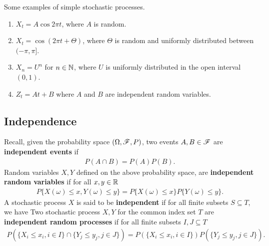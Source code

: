 \documentclass[letterpaper,10pt,english]{article}
\begin{document}
\begin{shaded*}
\begin{exmp}
Some examples of simple stochastic processes. 
\begin{enumerate}[i\_]
\item $X_t = A \cos 2\pi t$, where $A$ is random. 
\item $X_t = \cos(2\pi t+ \Theta)$, where $\Theta$ is random and uniformly distributed between $(-\pi, \pi]$. 
\item $X_n = U^n$ for $n \in \mathbb{N}$, where $U$ is uniformly distributed in the open interval $(0,1)$.
\item $Z_t = At +B$ where $A$ and $B$ are independent random variables. 
\end{enumerate}
\end{exmp}
\end{shaded*}

\subsection{Independence}
Recall, given the probability space $(\Omega, \mathscr{F}, P)$, two events $A, B \in \mathscr{F}$ are \textbf{independent events} if 
\begin{align*}
P(A\cap B) = P(A)P(B).
\end{align*}
Random variables $X,Y$ defined on the above probability space, are \textbf{independent random variables} if for all $x,y \in \mathbb{R}$
\begin{align*}
P\{X(\omega) \leq x, Y(\omega) \leq y\} = P\{X(\omega) \leq x\}P\{Y(\omega) \leq y\}.
\end{align*}
A stochastic process $X$ is said to be \textbf{independent} if for all finite subsets $S \subseteq T$, we have
Two stochastic process $X, Y$ for the common index set $T$ are \textbf{independent random processes} if for all %
finite subsets $I, J \subseteq T$ %
\begin{align*}
P\left(\{X_i \leq x_i, i \in I \}\cap\{Y_j \leq y_j, j \in J\}\right) = P\left(\{X_i \leq x_i, i \in I\}\right)P\left(\{Y_j \leq y_j, j \in J\}\right).
\end{align*}
\end{document}
